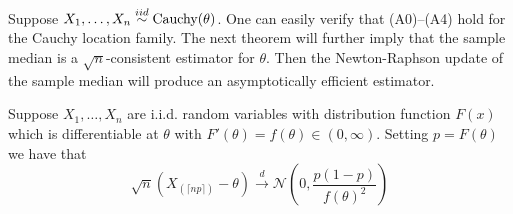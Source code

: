\begin{example}
	Suppose $X_1, \dots, X_n \overset{iid}{\sim} \text{Cauchy}(\theta)$. One can easily verify that (A0)--(A4) hold for the Cauchy location family. The next theorem will further imply that the sample median is a $\sqrt{n}$-consistent estimator for $\theta$. Then the Newton-Raphson update of the sample median will produce an asymptotically efficient estimator.
\end{example}


\begin{theorem}
	Suppose $X_1, \dots, X_n$ are i.i.d. random variables with distribution function $F(x)$ which is differentiable at $\theta$ with $F'(\theta) = f(\theta) \in (0, \infty)$. Setting $p = F(\theta)$ we have that \[
		\sqrt{n} (X_{(\lceil np \rceil)} - \theta) \overset{d}{\to} \mathcal{N}\left(0, \frac{p(1-p)}{f(\theta)^2}\right)
	\]
\end{theorem}

